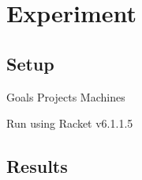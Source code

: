 \section{Experiment}
\label{experiment}
\subsection{Setup}
Goals
Projects
Machines


Run using Racket v6.1.1.5

\subsection{Results}

\newpage

\newpage


\newpage

